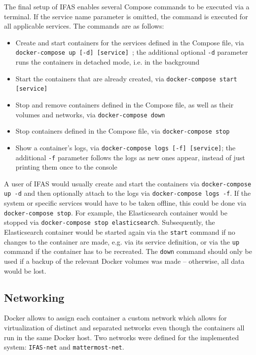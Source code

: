 The final setup of \ac{IFAS} enables several Compose commands to be executed via a terminal.
If the service name parameter is omitted, the command is executed for all applicable services.
The commands are as follows:

\begin{itemize}
\item Create and start containers for the services defined in the Compose file, via \texttt{docker-compose up [-d] [service] }; the additional optional \texttt{-d} parameter runs the containers in detached mode, i.e. in the background
\item Start the containers that are already created, via \texttt{docker-compose start [service]}
\item Stop and remove containers defined in the Compose file, as well as their volumes and networks, via \texttt{docker-compose down}
\item Stop containers defined in the Compose file, via \texttt{docker-compose stop}
\item Show a container's logs, via \texttt{docker-compose logs [-f] [service]}; the additional \texttt{-f} parameter follows the logs as new ones appear, instead of just printing them once to the  console
\end{itemize}

A user of \ac{IFAS} would usually create and start the containers via \texttt{docker-compose up -d} and then optionally attach to the logs via \texttt{docker-compose logs -f}.
If the system or specific services would have to be taken offline, this could be done via \texttt{docker-compose stop}.
For example, the Elasticsearch container would be stopped via \texttt{docker-compose stop elasticsearch}.
Subsequently, the Elasticsearch container would be started again via the \texttt{start} command if no changes to the container are made, e.g. via its service definition, or via the \texttt{up} command if the container has to be recreated.
The \texttt{down} command should only be used if a backup of the relevant Docker volumes was made -- otherwise, all data would be lost.

\subsection{Networking}

Docker allows to assign each container a custom network which allows for virtualization of distinct and separated networks even though the containers all run in the same Docker host.
Two networks were defined for the implemented system: \texttt{IFAS-net} and \texttt{mattermost-net}.

